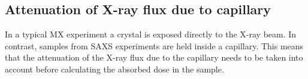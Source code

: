 \subsection{Attenuation of X-ray flux due to capillary}
\label{sub:Attenuation of X-ray flux due to capillary}
In a typical MX experiment a crystal is exposed directly to the X-ray beam.
In contrast, samples from SAXS experiments are held inside a capillary.
This means that the attenuation of the X-ray flux due to the capillary needs to be taken into account before calculating the absorbed dose in the sample.
